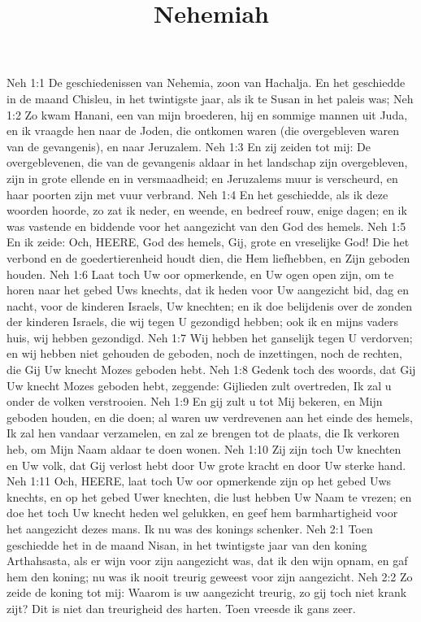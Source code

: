 

\title{Nehemiah}


Neh 1:1  De geschiedenissen van Nehemia, zoon van Hachalja. En het geschiedde in de maand Chisleu, in het twintigste jaar, als ik te Susan in het paleis was;
Neh 1:2  Zo kwam Hanani, een van mijn broederen, hij en sommige mannen uit Juda, en ik vraagde hen naar de Joden, die ontkomen waren (die overgebleven waren van de gevangenis), en naar Jeruzalem.
Neh 1:3  En zij zeiden tot mij: De overgeblevenen, die van de gevangenis aldaar in het landschap zijn overgebleven, zijn in grote ellende en in versmaadheid; en Jeruzalems muur is verscheurd, en haar poorten zijn met vuur verbrand.
Neh 1:4  En het geschiedde, als ik deze woorden hoorde, zo zat ik neder, en weende, en bedreef rouw, enige dagen; en ik was vastende en biddende voor het aangezicht van den God des hemels.
Neh 1:5  En ik zeide: Och, HEERE, God des hemels, Gij, grote en vreselijke God! Die het verbond en de goedertierenheid houdt dien, die Hem liefhebben, en Zijn geboden houden.
Neh 1:6  Laat toch Uw oor opmerkende, en Uw ogen open zijn, om te horen naar het gebed Uws knechts, dat ik heden voor Uw aangezicht bid, dag en nacht, voor de kinderen Israels, Uw knechten; en ik doe belijdenis over de zonden der kinderen Israels, die wij tegen U gezondigd hebben; ook ik en mijns vaders huis, wij hebben gezondigd.
Neh 1:7  Wij hebben het ganselijk tegen U verdorven; en wij hebben niet gehouden de geboden, noch de inzettingen, noch de rechten, die Gij Uw knecht Mozes geboden hebt.
Neh 1:8  Gedenk toch des woords, dat Gij Uw knecht Mozes geboden hebt, zeggende: Gijlieden zult overtreden, Ik zal u onder de volken verstrooien.
Neh 1:9  En gij zult u tot Mij bekeren, en Mijn geboden houden, en die doen; al waren uw verdrevenen aan het einde des hemels, Ik zal hen vandaar verzamelen, en zal ze brengen tot de plaats, die Ik verkoren heb, om Mijn Naam aldaar te doen wonen.
Neh 1:10  Zij zijn toch Uw knechten en Uw volk, dat Gij verlost hebt door Uw grote kracht en door Uw sterke hand.
Neh 1:11  Och, HEERE, laat toch Uw oor opmerkende zijn op het gebed Uws knechts, en op het gebed Uwer knechten, die lust hebben Uw Naam te vrezen; en doe het toch Uw knecht heden wel gelukken, en geef hem barmhartigheid voor het aangezicht dezes mans. Ik nu was des konings schenker.
Neh 2:1  Toen geschiedde het in de maand Nisan, in het twintigste jaar van den koning Arthahsasta, als er wijn voor zijn aangezicht was, dat ik den wijn opnam, en gaf hem den koning; nu was ik nooit treurig geweest voor zijn aangezicht.
Neh 2:2  Zo zeide de koning tot mij: Waarom is uw aangezicht treurig, zo gij toch niet krank zijt? Dit is niet dan treurigheid des harten. Toen vreesde ik gans zeer.
